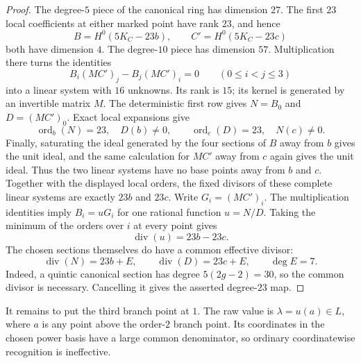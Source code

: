 \documentclass[11pt]{amsart}
\theoremstyle{definition}
\theoremstyle{remark}
\newcommand{\ord}{\operatorname{ord}}
\begin{document}
\begin{proof}
The degree-$5$ piece of the canonical ring has dimension $27$.  The first
$23$ local coefficients at either marked point have rank $23$, and hence
\[
 B=H^0(5K_C-23b),\qquad
 C'=H^0(5K_C-23c)
\]
both have dimension $4$.  The degree-$10$ piece has dimension $57$.
Multiplication there turns the identities
\[
 B_i(MC')_j-B_j(MC')_i=0\qquad(0\leq i<j\leq3)
\]
into a linear system with $16$ unknowns.  Its rank is $15$; its kernel is
generated by an invertible matrix $M$.  The deterministic first row gives
$N=B_0$ and $D=(MC')_0$.  Exact local expansions give
\[
 \ord_b(N)=23,\quad D(b)\ne0,\qquad
 \ord_c(D)=23,\quad N(c)\ne0.
\]
Finally, saturating the ideal generated by the four sections of $B$ away
from $b$ gives the unit ideal, and the same calculation for $MC'$ away from
$c$ again gives the unit ideal.  Thus the two linear systems have no base
points away from $b$ and $c$.  Together with the displayed local orders,
the fixed divisors of these complete linear systems are exactly $23b$
and $23c$.  Write $G_i=(MC')_i$.  The multiplication identities imply
$B_i=uG_i$ for one rational function $u=N/D$.  Taking the minimum of the
orders over $i$ at every point gives
\[
 \operatorname{div}(u)=23b-23c.
\]
The chosen sections themselves do have a common effective divisor:
\[
 \operatorname{div}(N)=23b+E,\qquad
 \operatorname{div}(D)=23c+E,\qquad \deg E=7.
\]
Indeed, a quintic canonical section has degree $5(2g-2)=30$, so the
common divisor is necessary.  Cancelling it gives the asserted
degree-$23$ map.
\end{proof}

It remains to put the third branch point at $1$.  The raw value is
$\lambda=u(a)\in L$, where $a$ is any point above the order-$2$ branch
point.  Its coordinates in the chosen power basis have a large common
denominator, so ordinary coordinatewise recognition is ineffective.
\end{document}
